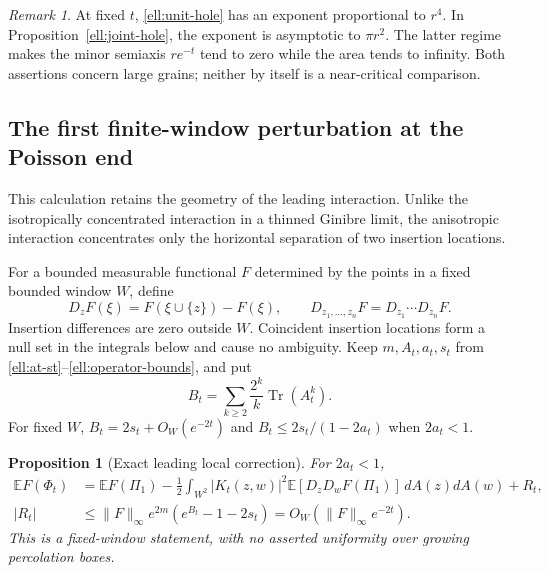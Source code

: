 \documentclass[11pt,a4paper]{article}
\newtheorem{proposition}[theorem]{Proposition}
\theoremstyle{definition}
\theoremstyle{remark}
\newtheorem{remark}[theorem]{Remark}
\numberwithin{equation}{section}
\begin{document}
\begin{remark}\label{ell:regime-scope}
At fixed $t$, \eqref{ell:unit-hole} has an exponent proportional
to $r^4$.  In Proposition~\ref{ell:joint-hole}, the exponent is
asymptotic to $\pi r^2$.  The latter regime makes the minor
semiaxis $r e^{-t}$ tend to zero while the area tends to infinity.
Both assertions concern large grains; neither by itself is a
near-critical comparison.
\end{remark}

\subsection{The first finite-window perturbation at the Poisson end}

This calculation retains the geometry of the leading interaction.
Unlike the isotropically concentrated interaction in a thinned
Ginibre limit, the anisotropic interaction concentrates only the
horizontal separation of two insertion locations.

For a bounded measurable functional $F$ determined by the points
in a fixed bounded window $W$, define
\[
 D_zF(\xi)=F(\xi\cup\{z\})-F(\xi),\qquad
 D_{z_1,\ldots,z_n}F=D_{z_1}\cdots D_{z_n}F.
\]
Insertion differences are zero outside $W$.  Coincident insertion
locations form a null set in the integrals below and cause no
ambiguity.  Keep $m,A_t,a_t,s_t$ from
\eqref{ell:at-st}--\eqref{ell:operator-bounds}, and put
\begin{equation}\label{ell:Bt}
 B_t=\sum_{k\ge2}\frac{2^k}{k}\operatorname{Tr}(A_t^k).
\end{equation}
For fixed $W$, $B_t=2s_t+O_W(e^{-2t})$ and
$B_t\le2s_t/(1-2a_t)$ when $2a_t<1$.

\begin{proposition}[Exact leading local correction]
\label{ell:local-perturbation}
For $2a_t<1$,
\begin{align}
 \mathbb EF(\Phi_t)
 &=\mathbb EF(\Pi_1)
 -\frac12\int_{W^2}|K_t(z,w)|^2
             \mathbb E[D_zD_wF(\Pi_1)]\,dA(z)dA(w)
 +R_t,\label{ell:perturbation}\\
 |R_t|&\le \|F\|_\infty e^{2m}
                  (e^{B_t}-1-2s_t)
       =O_W(\|F\|_\infty e^{-2t}).\label{ell:remainder}
\end{align}
This is a fixed-window statement, with no asserted uniformity
over growing percolation boxes.
\end{proposition}
\end{document}

